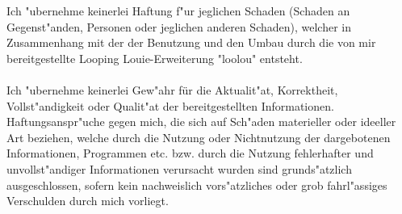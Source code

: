 \label{section:disclaimer}
Ich "ubernehme keinerlei Haftung f"ur jeglichen Schaden (Schaden an Gegenst"anden, Personen oder jeglichen anderen Schaden), welcher in Zusammenhang mit der der Benutzung und den Umbau durch die von mir bereitgestellte Looping Louie-Erweiterung "loolou" entsteht. \\
\\
Ich "ubernehme keinerlei Gew"ahr für die Aktualit"at, Korrektheit, Vollst"andigkeit oder Qualit"at der bereitgestellten Informationen.
Haftungsanspr"uche gegen mich, die sich auf Sch"aden materieller oder ideeller Art beziehen, welche durch die Nutzung oder Nichtnutzung der dargebotenen Informationen, Programmen etc. bzw. durch die Nutzung fehlerhafter und unvollst"andiger Informationen verursacht wurden sind grunds"atzlich ausgeschlossen, sofern kein nachweislich vors"atzliches oder grob fahrl"assiges Verschulden durch mich vorliegt.
